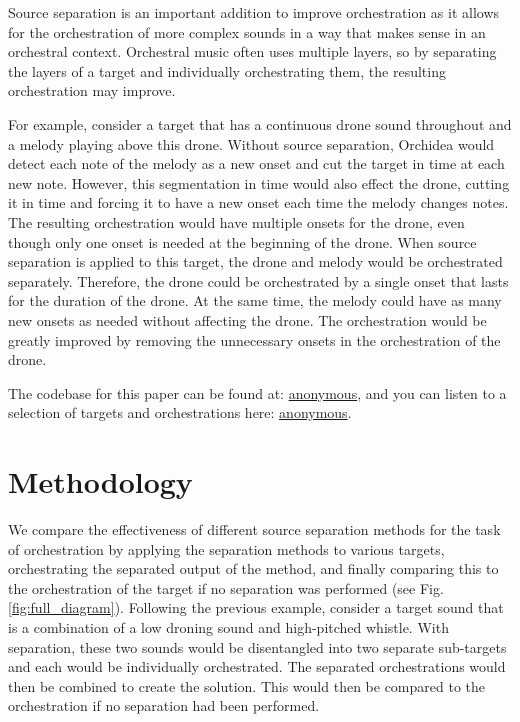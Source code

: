 \documentclass{article}
\begin{document}
  Source separation is an important addition to improve orchestration as it allows for the orchestration of more complex sounds in a way that makes sense in an orchestral context. Orchestral music often uses multiple layers, so by separating the layers of a target and individually orchestrating them, the resulting orchestration may improve. 
    
  For example, consider a target that has a continuous drone sound throughout and a melody playing above this drone. Without source separation, Orchidea would detect each note of the melody as a new onset and cut the target in time at each new note. However, this segmentation in time would also effect the drone, cutting it in time and forcing it to have a new onset each time the melody changes notes. The resulting orchestration would have multiple onsets for the drone, even though only one onset is needed at the beginning of the drone. When source separation is applied to this target, the drone and melody would be orchestrated separately. Therefore, the drone could be orchestrated by a single onset that lasts for the duration of the drone. At the same time, the melody could have as many new onsets as needed without affecting the drone. The orchestration would be greatly improved by removing the unnecessary onsets in the orchestration of the drone.
    
  The codebase for this paper can be found at: \url{anonymous}, and you can listen to a selection of targets and orchestrations here: \url{anonymous}.
    
  
  \section{Methodology}\label{sec:methodology}
  
  We compare the effectiveness of different source separation methods for the task of orchestration by applying the separation methods to various targets, orchestrating the separated output of the method, and finally comparing this to the orchestration of the target if no separation was performed (see Fig. \ref{fig:full_diagram}). Following the previous example, consider a target sound that is a combination of a low droning sound and high-pitched whistle. With separation, these two sounds would be disentangled into two separate sub-targets and each would be individually orchestrated. The separated orchestrations would then be combined to create the solution. This would then be compared to the orchestration if no separation had been performed.
  
\end{document}

